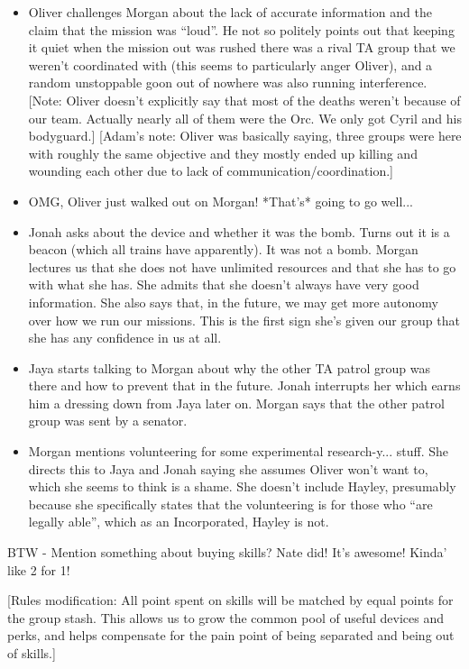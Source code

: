\begin{itemize}
\item Oliver challenges Morgan about the lack of accurate information and the claim that the mission was ``loud''.  He not so politely points out that keeping it quiet when the mission out was rushed there was a rival TA group that we weren't coordinated with (this seems to particularly anger Oliver), and a random unstoppable goon out of nowhere was also running interference.  {[}Note: Oliver doesn't explicitly say that most of the deaths weren't because of our team.  Actually nearly all of them were the Orc.  We only got Cyril and his bodyguard.{]}  {[}Adam's note: Oliver was basically saying, three groups were here with roughly the same objective and they mostly ended up killing and wounding each other due to lack of communication/coordination.{]}
\item OMG, Oliver just walked out on Morgan! *That's* going to go well...  
\item Jonah asks about the device and whether it was the bomb.  Turns out it is a beacon (which all trains have apparently).  It was not a bomb.  Morgan lectures us that she does not have unlimited resources and that she has to go with what she has.  She admits that she doesn't always have very good information.  She also says that, in the future, we may get more autonomy over how we run our missions.  This is the first sign she's given our group that she has any confidence in us at all.
\item Jaya starts talking to Morgan about why the other TA patrol group was there and how to prevent that in the future.  Jonah interrupts her which earns him a dressing down from Jaya later on.  Morgan says that the other patrol group was sent by a senator.
\item Morgan mentions volunteering for some experimental research-y... stuff.  She directs this to Jaya and Jonah saying she assumes Oliver won't want to, which she seems to think is a shame.  She doesn't include Hayley, presumably because she specifically states that the volunteering is for those who ``are legally able'', which as an Incorporated, Hayley is not.
\end{itemize}



BTW - Mention something about buying skills?   Nate did! It's awesome! Kinda' like 2 for 1!



{[}Rules modification: All point spent on skills will be matched by equal points for the group stash.  This allows us to grow the common pool of useful devices and perks, and helps compensate for the pain point of being separated and being out of skills.{]}



